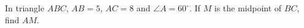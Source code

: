 In triangle $ABC$, $AB=5$, $AC=8$ and $\angle A=60^\circ$. If $M$ is the midpoint of $BC$, find $AM$.
